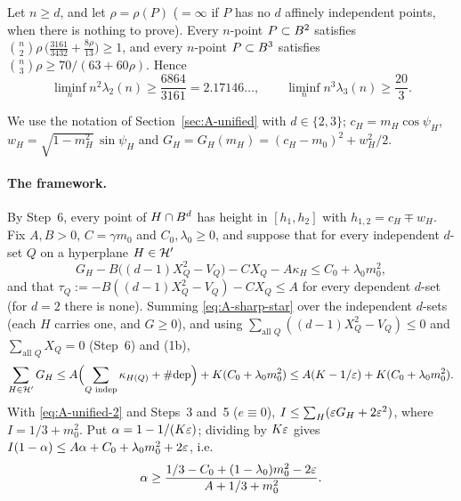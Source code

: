 \begin{proposition}\label{prop:A-sharp}
Let $n \ge d$, and let $\rho = \rho(P)$ ($= \infty$ if $P$ has no $d$ affinely independent points, when there is
nothing to prove). Every $n$-point $P \subset B^2$ satisfies $\binom n2\rho\,\bigl(\frac{3161}{3432} + \frac{8\rho}{13}\bigr) \ge 1$,
and every $n$-point $P \subset B^3$ satisfies $\binom n3\rho \ge 70/(63 + 60\rho)$. Hence
\[
  \liminf_n n^2\lambda_2(n) \ge \frac{6864}{3161} = 2.17146\ldots,
  \qquad
  \liminf_n n^3\lambda_3(n) \ge \frac{20}{3}.
\]
\end{proposition}

We use the notation of Section~\ref{sec:A-unified} with $d \in \{2, 3\}$; $c_H = m_H\cos\psi_H$,
$w_H = \sqrt{1 - m_H^2}\,\sin\psi_H$ and $G_H = G_H(m_H) = (c_H - m_0)^2 + w_H^2/2$.

\paragraph{The framework.} By Step~6, every point of $H \cap B^d$ has height in
$[h_1, h_2]$ with $h_{1,2} = c_H \mp w_H$. Fix $A, B > 0$, $C = \gamma m_0$ and $C_0, \lambda_0 \ge 0$,
and suppose that for every independent $d$-set $Q$ on a hyperplane $H \in \mathcal{H}'$
\begin{equation}\label{eq:A-sharp-star}
  G_H - B\bigl((d-1)X_Q^2 - V_Q\bigr) - C X_Q - A\kappa_H \le C_0 + \lambda_0 m_0^2,
\end{equation}
and that $\tau_Q := -B((d-1)X_Q^2 - V_Q) - CX_Q \le A$ for every dependent $d$-set (for $d = 2$ there is
none). Summing \eqref{eq:A-sharp-star} over the independent $d$-sets (each $H$ carries one, and
$G \ge 0$), and using $\sum_{\text{all }Q}((d-1)X_Q^2 - V_Q) \le 0$ and $\sum_{\text{all }Q}X_Q = 0$
(Step~6) and (1b),
\[
  \sum_{H \in \mathcal{H}'} G_H \le A\Bigl(\sum_{Q\text{ indep}}\kappa_{H(Q)} + \#\mathrm{dep}\Bigr) + K(C_0 + \lambda_0m_0^2)
    \le A(K - 1/\varepsilon) + K(C_0 + \lambda_0m_0^2).
\]
With \eqref{eq:A-unified-2} and Steps~3 and~5 ($e \equiv 0$), $I \le \sum_H(\varepsilon G_H + 2\varepsilon^2)$, where
$I = 1/3 + m_0^2$. Put $\alpha = 1 - 1/(K\varepsilon)$; dividing by $K\varepsilon$ gives
$I(1 - \alpha) \le A\alpha + C_0 + \lambda_0m_0^2 + 2\varepsilon$, i.e.
\begin{equation}\label{eq:A-sharp-alpha}
  \alpha \ge \frac{1/3 - C_0 + (1 - \lambda_0)m_0^2 - 2\varepsilon}{A + 1/3 + m_0^2}.
\end{equation}

